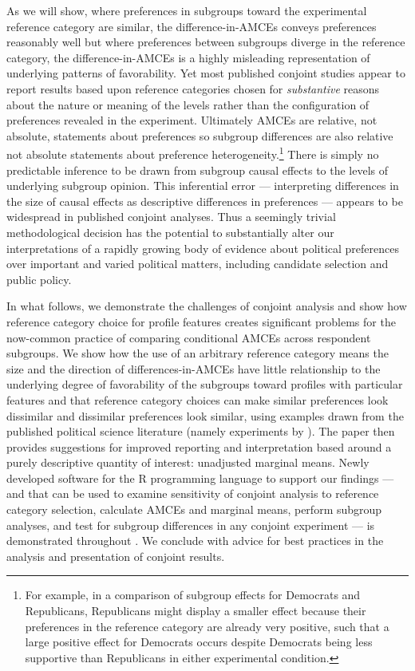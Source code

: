 \documentclass[a4paper,12pt]{article}\usepackage[]{graphicx}\usepackage[]{color}
\begin{document}
As we will show, where preferences in subgroups toward the experimental reference category are similar, the difference-in-AMCEs conveys preferences reasonably well but where preferences between subgroups diverge in the reference category, the difference-in-AMCEs is a highly misleading representation of underlying patterns of favorability. Yet most published conjoint studies appear to report results based upon reference categories chosen for \textit{substantive} reasons about the nature or meaning of the levels rather than the configuration of preferences revealed in the experiment. Ultimately AMCEs are relative, not absolute, statements about preferences so subgroup differences are also relative not absolute statements about preference heterogeneity.\footnote{For example, in a comparison of subgroup effects for Democrats and Republicans, Republicans might display a smaller effect because their preferences in the reference category are already very positive, such that a large positive effect for Democrats occurs despite Democrats being less supportive than Republicans in either experimental condition.} There is simply no predictable inference to be drawn from subgroup causal effects to the levels of underlying subgroup opinion. This inferential error --- interpreting differences in the size of causal effects as descriptive differences in preferences --- appears to be widespread in published conjoint analyses. Thus a seemingly trivial methodological decision has the potential to substantially alter our interpretations of a rapidly growing body of evidence about political preferences over important and varied political matters, including candidate selection and public policy.

In what follows, we demonstrate the challenges of conjoint analysis and show how reference category choice for profile features creates significant problems for the now-common practice of comparing conditional AMCEs across respondent subgroups. We show how the use of an arbitrary reference category means the size and the direction of differences-in-AMCEs have little relationship to the underlying degree of favorability of the subgroups toward profiles with particular features and that reference category choices can make similar preferences look dissimilar and dissimilar preferences look similar, using examples drawn from the published political science literature (namely experiments by \citealt{HainmuellerHopkinsYamamoto2014, BallardRosaMartinScheve2016, TeeleKallaRosenbluth2018}). The paper then provides suggestions for improved reporting and interpretation based around a purely descriptive quantity of interest: unadjusted marginal means. Newly developed software for the R programming language to support our findings --- and that can be used to examine sensitivity of conjoint analysis to reference category selection, calculate AMCEs and marginal means, perform subgroup analyses, and test for subgroup differences in any conjoint experiment --- is demonstrated throughout \citep{Leeper2018cregg}. We conclude with advice for best practices in the analysis and presentation of conjoint results.
\end{document}
